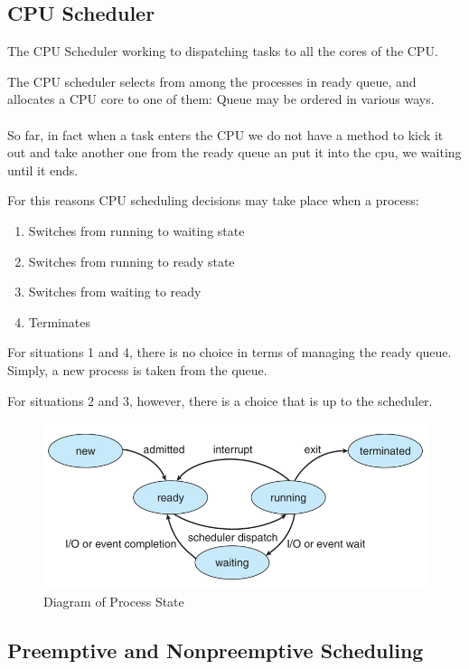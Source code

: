 \newpage
\subsection{CPU Scheduler}
The CPU Scheduler working to dispatching tasks to all the cores of the CPU. 

The CPU scheduler selects from among the processes in ready queue, and allocates a CPU core to one of them: Queue may be ordered in various ways.

\paragraph{}
So far, in fact when a task enters the CPU we do not have a method to kick it out and take another one from the ready queue an put it into the cpu, we waiting until it ends.

For this reasons CPU scheduling decisions may take place when a process:
\begin{enumerate}
    \item Switches from running to waiting state
    \item Switches from running to ready state
    \item Switches from waiting to ready
    \item Terminates
\end{enumerate}

For situations 1 and 4, there is no choice in terms of managing the
ready queue. Simply, a new process is taken from the queue.

For situations 2 and 3, however, there is a choice that is up to the
scheduler.

\begin{figure}[htbp]
    \centering
    \includegraphics[width=0.65\linewidth]{img/process_state_diagram.png}
    \caption{Diagram of Process State}    
\end{figure}

\subsection{Preemptive and Nonpreemptive Scheduling}

